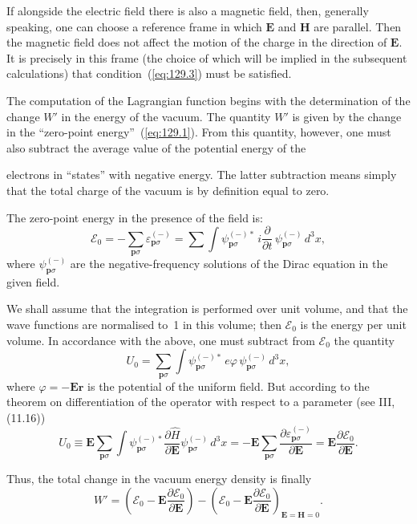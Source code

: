 If alongside the electric field there is also a magnetic field, then, generally speaking, one can choose a reference frame in which $\mathbf{E}$ and $\mathbf{H}$ are parallel. Then the magnetic field does not affect the motion of the charge in the direction of $\mathbf{E}$. It is precisely in this frame (the choice of which will be implied in the subsequent calculations) that condition~(\ref{eq:129.3}) must be satisfied.

The computation of the Lagrangian function begins with the determination of the change $W'$ in the energy of the vacuum. The quantity $W'$ is given by the change in the ``zero-point energy''~(\ref{eq:129.1}). From this quantity, however, one must also subtract the average value of the potential energy of the


\noindent electrons in ``states'' with negative energy. The latter subtraction means simply that the total charge of the vacuum is by definition equal to zero.

The zero-point energy in the presence of the field is:
\begin{equation}
\mathcal{E}_0 = -\sum_{\mathbf{p}\sigma}\varepsilon_{\mathbf{p}\sigma}^{(-)} = \sum\int\psi_{\mathbf{p}\sigma}^{(-)*}\,i\frac{\partial}{\partial t}\,\psi_{\mathbf{p}\sigma}^{(-)}\,d^3x,
\label{eq:129.4}
\end{equation}
where $\psi_{\mathbf{p}\sigma}^{(-)}$ are the negative-frequency solutions of the Dirac equation in the given field.

We shall assume that the integration is performed over unit volume, and that the wave functions are normalised to~1 in this volume; then $\mathcal{E}_0$ is the energy per unit volume. In accordance with the above, one must subtract from $\mathcal{E}_0$ the quantity
\[
U_0 = \sum_{\mathbf{p}\sigma}\int\psi_{\mathbf{p}\sigma}^{(-)*}\,e\varphi\,\psi_{\mathbf{p}\sigma}^{(-)}\,d^3x,
\]
where $\varphi = -\mathbf{E}\mathbf{r}$ is the potential of the uniform field. But according to the theorem on differentiation of the operator with respect to a parameter (see III, (11.16))
\[
U_0 \equiv \mathbf{E}\sum_{\mathbf{p}\sigma}\int\psi_{\mathbf{p}\sigma}^{(-)*}\frac{\partial\hat{H}}{\partial\mathbf{E}}\psi_{\mathbf{p}\sigma}^{(-)}\,d^3x = -\mathbf{E}\sum_{\mathbf{p}\sigma}\frac{\partial\varepsilon_{\mathbf{p}\sigma}^{(-)}}{\partial\mathbf{E}} = \mathbf{E}\frac{\partial\mathcal{E}_0}{\partial\mathbf{E}}.
\]

Thus, the total change in the vacuum energy density is finally
\begin{equation}
W' = \left(\mathcal{E}_0 - \mathbf{E}\frac{\partial\mathcal{E}_0}{\partial\mathbf{E}}\right) - \left(\mathcal{E}_0 - \mathbf{E}\frac{\partial\mathcal{E}_0}{\partial\mathbf{E}}\right)_{\!\mathbf{E}=\mathbf{H}=0}\!\!\!.
\label{eq:129.5}
\end{equation}

